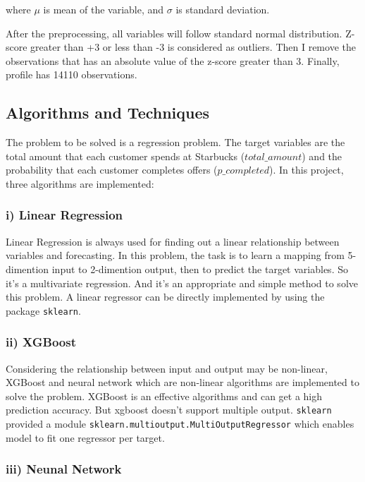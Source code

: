 \documentclass[a4paper,12pt]{article}
\begin{document}
where $\mu$ is mean of the variable, and $\sigma$ is standard deviation.

After the preprocessing, all variables will follow standard normal distribution. Z-score greater than +3 or less than -3 is 
considered as outliers. Then I remove the observations that has an absolute value of the z-score greater than 3. Finally, 
profile has 14110 observations.

\subsection*{Algorithms and Techniques}

The problem to be solved is a regression problem. The target variables are the total amount that each customer spends at 
Starbucks ($total\_amount$) and the probability that each customer completes offers ($p\_completed$). In this project, three 
algorithms are implemented:

\subsubsection*{i) Linear Regression}

Linear Regression is always used for finding out a linear relationship between variables and forecasting. In this problem, the 
task is to learn a mapping from 5-dimention input to 2-dimention output, then to predict the target variables. So it's a 
multivariate regression. And it's an appropriate and simple method to solve this problem. A linear regressor can be directly 
implemented by using the package \texttt{sklearn}.

\subsubsection*{ii) XGBoost}

Considering the relationship between input and output may be non-linear, XGBoost and neural network which are non-linear 
algorithms are implemented to solve the problem. XGBoost is an effective algorithms and can get a high prediction accuracy. But 
xgboost doesn't support multiple output. \texttt{sklearn} provided a module \texttt{sklearn.multioutput.MultiOutputRegressor} 
which enables model to fit one regressor per target.

\subsubsection*{iii) Neunal Network}
\end{document}

